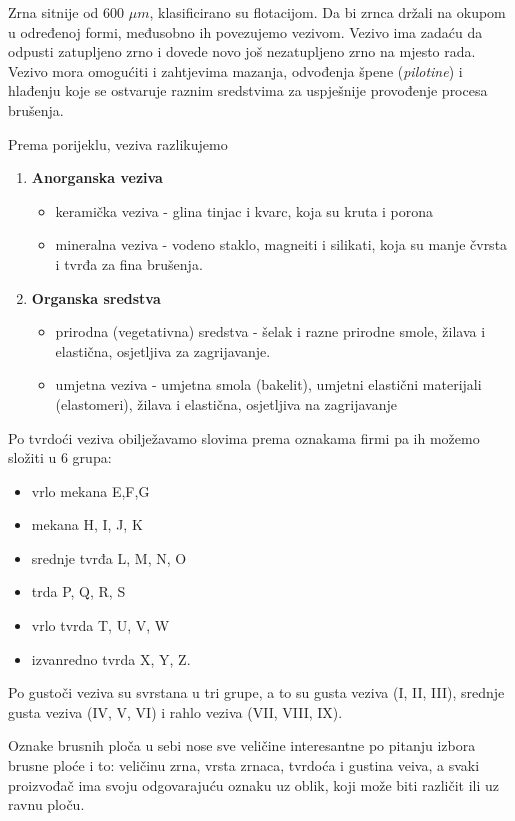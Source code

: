 \documentclass[a4paper,12pt]{article}
\numberwithin{figure}{section}
\begin{document}
Zrna sitnije od 600 $\mu m$, klasificirano su flotacijom. Da bi zrnca držali na okupom u određenoj formi, međusobno ih povezujemo vezivom. Vezivo ima zadaću da odpusti zatupljeno zrno i dovede novo još nezatupljeno zrno na mjesto rada. Vezivo mora omogućiti i zahtjevima mazanja, odvođenja špene (\textit{pilotine}) i hlađenju koje se ostvaruje raznim sredstvima za uspješnije provođenje procesa brušenja. \par
Prema porijeklu, veziva razlikujemo 
\begin{enumerate}
\item \textbf{Anorganska veziva}
\begin{itemize}
\item keramička veziva - glina tinjac i kvarc, koja su kruta i porona
\item mineralna veziva - vodeno staklo, magneiti i silikati, koja su manje čvrsta i tvrđa za fina brušenja.
\end{itemize}
\item \textbf{Organska sredstva}
\begin{itemize}
\item prirodna (vegetativna) sredstva - šelak i razne prirodne smole, žilava i elastična, osjetljiva za zagrijavanje.
\item umjetna veziva - umjetna smola (bakelit), umjetni elastični materijali (elastomeri), žilava i elastična, osjetljiva na zagrijavanje
\end{itemize}
\end{enumerate}
Po tvrdoći veziva obilježavamo slovima prema oznakama firmi pa ih možemo složiti u 6 grupa:
\begin{itemize}
\item vrlo mekana E,F,G
\item mekana H, I, J, K
\item srednje tvrđa L, M, N, O
\item trda P, Q, R, S
\item vrlo tvrda T, U, V, W
\item izvanredno tvrda X, Y, Z.
\end{itemize}
Po gustoči veziva su svrstana u tri grupe, a to su gusta veziva  (I, II, III), srednje gusta veziva (IV, V, VI) i rahlo veziva (VII, VIII, IX).\par
Oznake brusnih ploča u sebi nose sve veličine interesantne po pitanju izbora brusne ploće i to: veličinu zrna, vrsta zrnaca, tvrdoća i gustina veiva, a svaki proizvođač ima svoju odgovarajuću oznaku uz oblik, koji može biti različit ili uz ravnu ploču.
\end{document}
